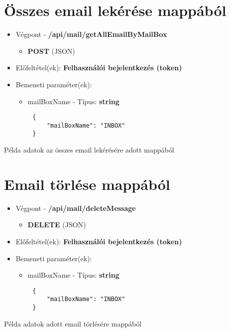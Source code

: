 \section{Összes email lekérése mappából}
\begin{itemize}
    \item Végpont - \textbf{/api/mail/getAllEmailByMailBox}
    \begin{itemize}
        \item \textbf{POST} (JSON)
    \end{itemize}
    \item Előfeltétel(ek): \textbf{Felhasználói bejelentkezés (token)}
\end{itemize}
\begin{itemize}
    \item Bemeneti paraméter(ek):
    \begin{itemize}
        \item mailBoxName - Típus: \textbf{string}
    \end{itemize}
\end{itemize}
\begin{listing}[H]
    \begin{verbatim}
        {
            "mailBoxName": "INBOX"
        }
    \end{verbatim}
    \caption{Példa adatok az összes email lekérésére adott mappából}
    \label{code:json_mailbox_all}
\end{listing}

\section{Email törlése mappából}
\begin{itemize}
    \item Végpont - \textbf{/api/mail/deleteMessage}
    \begin{itemize}
        \item \textbf{DELETE} (JSON)
    \end{itemize}
    \item Előfeltétel(ek): \textbf{Felhasználói bejelentkezés (token)}
\end{itemize}
\begin{itemize}
    \item Bemeneti paraméter(ek):
    \begin{itemize}
        \item mailBoxName - Típus: \textbf{string}
    \end{itemize}
\end{itemize}
\begin{listing}[H]
    \begin{verbatim}
        {
            "mailBoxName": "INBOX"
        }
    \end{verbatim}
    \caption{Példa adatok adott email törlésére mappából}
    \label{code:json_delete_email_mailbox}
\end{listing}

